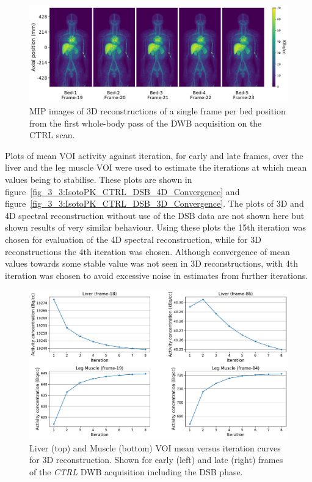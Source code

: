 \begin{figure} [h!]
\centering
\includegraphics[scale=0.52,angle=0]{3_Results/3_3_DWB_Reconstruction/figures/3_3_IsotoPK_CTRL_DWB_4D.pdf}
\caption{MIP images of 3D reconstructions of a single frame per bed position from the first whole-body pass of the DWB acquisition on the CTRL scan.}
\label{fig_3_3:IsotoPK_CTRL_DWB_4D}
\end{figure} 

Plots of mean VOI activity against iteration, for early and late frames, over the liver and the leg muscle VOI were used to estimate the iterations at which mean values being to stabilise. These plots are shown in figure~\ref{fig_3_3:IsotoPK_CTRL_DSB_4D_Convergence} and figure~\ref{fig_3_3:IsotoPK_CTRL_DSB_3D_Convergence}. 
The plots of 3D and 4D spectral reconstruction without use of the DSB data are not shown here but shown results of very similar behaviour. 
Using these plots the 15th iteration was chosen for evaluation of the 4D spectral reconstruction, while for 3D reconstructions the 4th iteration was chosen. Although convergence of mean values towards some stable value was not seen in 3D reconstructions, with 4th iteration was chosen to avoid excessive noise in estimates from further iterations. 

\begin{figure} [h!]
\centering
\includegraphics[scale=0.5,angle=0]{3_Results/3_3_DWB_Reconstruction/figures/3_3_IsotoPK_CTRL_DWB_3D_Convergence.pdf}
\caption{Liver (top) and Muscle (bottom) VOI mean versus iteration curves for 3D reconstruction. Shown for early (left) and late (right) frames of the \textit{CTRL} DWB acquisition including the DSB phase.}
\label{fig_3_3:IsotoPK_CTRL_DWB_4D_Convergence}
\end{figure} 

